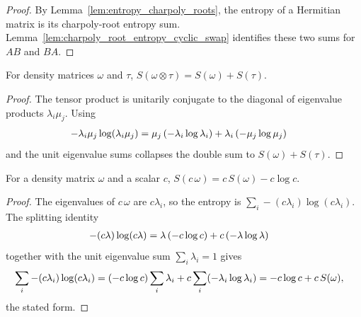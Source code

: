 \begin{proof}\leanok
    By Lemma~\ref{lem:entropy_charpoly_roots}, the entropy of a Hermitian matrix
    is its charpoly-root entropy sum.
    Lemma~\ref{lem:charpoly_root_entropy_cyclic_swap} identifies these two sums
    for $AB$ and $BA$.
\end{proof}

\begin{theorem}
    \label{thm:entropy_kronecker}
    \leanok
    For density matrices $\omega$ and $\tau$,
    $S(\omega\otimes\tau)=S(\omega)+S(\tau)$.
\end{theorem}

\begin{proof}\leanok
    The tensor product is unitarily conjugate to the diagonal of eigenvalue
    products $\lambda_i\mu_j$. Using
    \begin{align}
        -\lambda_i\mu_j\log(\lambda_i\mu_j)
        &=\mu_j\,(-\lambda_i\log\lambda_i)
          +\lambda_i\,(-\mu_j\log\mu_j)
        \notag
    \end{align}
    and the unit eigenvalue sums collapses the double sum to
    $S(\omega)+S(\tau)$.
\end{proof}

\begin{theorem}
    \label{thm:entropy_smul}
    \leanok
    For a density matrix $\omega$ and a scalar $c$,
    $S(c\,\omega)=c\,S(\omega)-c\log c$.
\end{theorem}

\begin{proof}\leanok
    The eigenvalues of $c\,\omega$ are $c\lambda_i$, so the entropy is
    $\sum_i-(c\lambda_i)\log(c\lambda_i)$. The splitting identity
    \begin{align}
        -(c\lambda)\log(c\lambda)
        &=\lambda\,(-c\log c)+c\,(-\lambda\log\lambda)
        \notag
    \end{align}
    together with the unit eigenvalue sum $\sum_i\lambda_i=1$ gives
    \begin{align}
        \sum_i-(c\lambda_i)\log(c\lambda_i)
        &=(-c\log c)\sum_i\lambda_i
          +c\sum_i(-\lambda_i\log\lambda_i)
          =-c\log c+c\,S(\omega),
        \notag
    \end{align}
    the stated form.
\end{proof}

